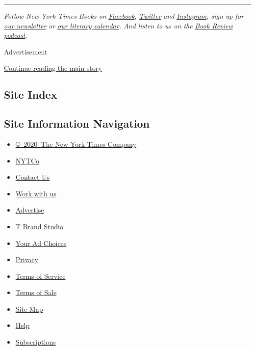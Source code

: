 \begin{center}\rule{0.5\linewidth}{\linethickness}\end{center}

\emph{Follow New York Times Books on}
\href{https://www.facebook.com/nytbooks/}{\emph{Facebook}}\emph{,}
\href{https://twitter.com/nytimesbooks}{\emph{Twitter}} \emph{and}
\href{https://www.instagram.com/nytbooks/}{\emph{Instagram}}\emph{, sign
up for}
\href{https://www.nytimes.com/newsletters/books-review}{\emph{our
newsletter}} \emph{or}
\href{https://www.nytimes.com/interactive/2017/books/books-calendar.html}{\emph{our
literary calendar}}\emph{. And listen to us on the}
\href{https://www.nytimes.com/column/book-review-podcast}{\emph{Book
Review podcast}}\emph{.}

Advertisement

\protect\hyperlink{after-bottom}{Continue reading the main story}

\hypertarget{site-index}{%
\subsection{Site Index}\label{site-index}}

\hypertarget{site-information-navigation}{%
\subsection{Site Information
Navigation}\label{site-information-navigation}}

\begin{itemize}
\tightlist
\item
  \href{https://help.nytimes.com/hc/en-us/articles/115014792127-Copyright-notice}{©~2020~The
  New York Times Company}
\end{itemize}

\begin{itemize}
\tightlist
\item
  \href{https://www.nytco.com/}{NYTCo}
\item
  \href{https://help.nytimes.com/hc/en-us/articles/115015385887-Contact-Us}{Contact
  Us}
\item
  \href{https://www.nytco.com/careers/}{Work with us}
\item
  \href{https://nytmediakit.com/}{Advertise}
\item
  \href{http://www.tbrandstudio.com/}{T Brand Studio}
\item
  \href{https://www.nytimes.com/privacy/cookie-policy\#how-do-i-manage-trackers}{Your
  Ad Choices}
\item
  \href{https://www.nytimes.com/privacy}{Privacy}
\item
  \href{https://help.nytimes.com/hc/en-us/articles/115014893428-Terms-of-service}{Terms
  of Service}
\item
  \href{https://help.nytimes.com/hc/en-us/articles/115014893968-Terms-of-sale}{Terms
  of Sale}
\item
  \href{https://spiderbites.nytimes.com}{Site Map}
\item
  \href{https://help.nytimes.com/hc/en-us}{Help}
\item
  \href{https://www.nytimes.com/subscription?campaignId=37WXW}{Subscriptions}
\end{itemize}
